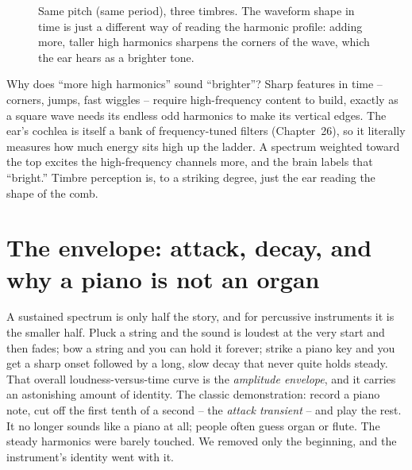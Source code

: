 \begin{figure}[H]
\centering
{}
\caption{Same pitch (same period), three timbres. The waveform shape in time is just a different way
of reading the harmonic profile: adding more, taller high harmonics sharpens the corners of the wave,
which the ear hears as a brighter tone.}
\label{ch29:fig-timbres}
\end{figure}

\begin{whybox}
Why does ``more high harmonics'' sound ``brighter''? Sharp features in time -- corners, jumps, fast
wiggles -- require high-frequency content to build, exactly as a square wave needs its endless odd
harmonics to make its vertical edges. The ear's cochlea is itself a bank of frequency-tuned filters
(Chapter~26), so it literally measures how much energy sits high up the ladder. A spectrum weighted
toward the top excites the high-frequency channels more, and the brain labels that ``bright.'' Timbre
perception is, to a striking degree, just the ear reading the shape of the comb.
\end{whybox}

\section{The envelope: attack, decay, and why a piano is not an organ}
\label{ch29:envelope}

A sustained spectrum is only half the story, and for percussive instruments it is the smaller half.
Pluck a string and the sound is loudest at the very start and then fades; bow a string and you can
hold it forever; strike a piano key and you get a sharp onset followed by a long, slow decay that
never quite holds steady. That overall loudness-versus-time curve is the \emph{amplitude envelope},
and it carries an astonishing amount of identity. The classic demonstration: record a piano note, cut
off the first tenth of a second -- the \emph{attack transient} -- and play the rest. It no longer
sounds like a piano at all; people often guess organ or flute. The steady harmonics were barely
touched. We removed only the beginning, and the instrument's identity went with it.

